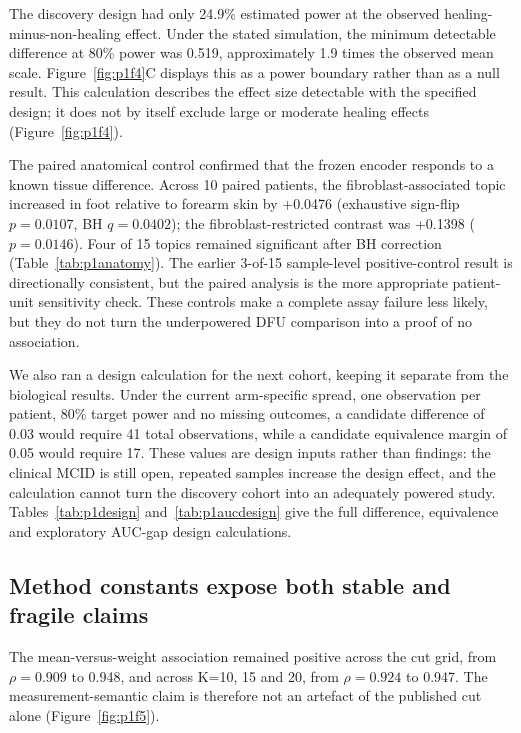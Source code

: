 The discovery design had only 24.9\% estimated power at the observed healing-minus-non-healing effect. Under the stated simulation, the minimum detectable difference at 80\% power was 0.519, approximately 1.9 times the observed mean scale. Figure~\ref{fig:p1f4}\label{call:p1f4}C displays this as a power boundary rather than as a null result. This calculation describes the effect size detectable with the specified design; it does not by itself exclude large or moderate healing effects (Figure~\ref{fig:p1f4}).



The paired anatomical control confirmed that the frozen encoder responds to a known tissue difference. Across 10 paired patients, the fibroblast-associated topic increased in foot relative to forearm skin by +0.0476 (exhaustive sign-flip $p=0.0107$, BH $q=0.0402$); the fibroblast-restricted contrast was +0.1398 ($p=0.0146$). Four of 15 topics remained significant after BH correction (Table~\ref{tab:p1anatomy}). The earlier 3-of-15 sample-level positive-control result is directionally consistent, but the paired analysis is the more appropriate patient-unit sensitivity check. These controls make a complete assay failure less likely, but they do not turn the underpowered DFU comparison into a proof of no association.

We also ran a design calculation for the next cohort, keeping it separate from the biological results. Under the current arm-specific spread, one observation per patient, 80\% target power and no missing outcomes, a candidate difference of 0.03 would require 41 total observations, while a candidate equivalence margin of 0.05 would require 17. These values are design inputs rather than findings: the clinical MCID is still open, repeated samples increase the design effect, and the calculation cannot turn the discovery cohort into an adequately powered study. Tables~\ref{tab:p1design} and~\ref{tab:p1aucdesign} give the full difference, equivalence and exploratory AUC-gap design calculations.

\subsection{Method constants expose both stable and fragile claims}

The mean-versus-weight association remained positive across the cut grid, from $\rho=0.909$ to 0.948, and across K=10, 15 and 20, from $\rho=0.924$ to 0.947. The measurement-semantic claim is therefore not an artefact of the published cut alone (Figure~\ref{fig:p1f5}\label{call:p1f5}).

